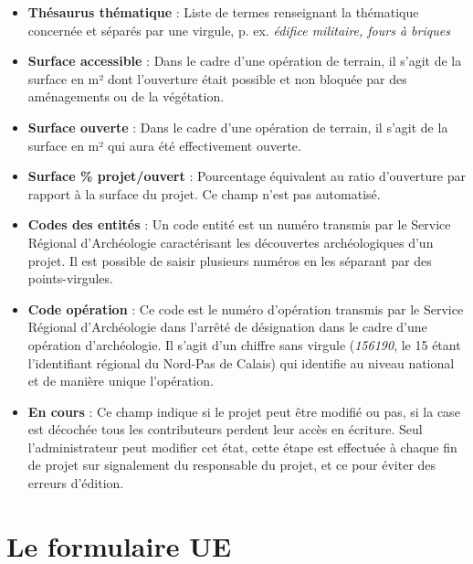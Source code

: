 \documentclass[letterpaper,10pt,french]{sphinxmanual}
\begin{document}
\begin{itemize}
\item {} 
\textbf{Thésaurus thématique} : Liste de termes renseignant la thématique concernée et séparés par une virgule, p. ex. \emph{édifice militaire, fours à briques}

\item {} 
\textbf{Surface accessible} : Dans le cadre d'une opération de terrain, il s'agit de la surface en m² dont l'ouverture était possible et non bloquée par des aménagements ou de la végétation.

\item {} 
\textbf{Surface ouverte} : Dans le cadre d'une opération de terrain, il s'agit de la surface en m² qui aura été effectivement ouverte.

\item {} 
\textbf{Surface \% projet/ouvert} : Pourcentage équivalent au ratio d'ouverture par rapport à la surface du projet.  Ce champ n'est pas automatisé.

\item {} 
\textbf{Codes des entités} : Un code entité est un numéro transmis par le Service Régional d'Archéologie caractérisant les découvertes archéologiques d'un projet. Il est possible de saisir plusieurs numéros en les séparant par des points-virgules.

\item {} 
\textbf{Code opération} : Ce code est le numéro d'opération transmis par le Service Régional d'Archéologie dans l'arrêté de désignation dans le cadre d'une opération d'archéologie. Il s'agit d'un chiffre sans virgule (\emph{156190}, le 15 étant l'identifiant régional du Nord-Pas de Calais) qui identifie au niveau national et de manière unique l'opération.

\item {} 
\textbf{En cours} : Ce champ indique si le projet peut être modifié ou pas, si la case est décochée tous les contributeurs perdent leur accès en écriture. Seul l'administrateur peut modifier cet état, cette étape est effectuée à chaque fin de projet sur signalement du responsable du projet, et ce pour éviter des erreurs d'édition.

\end{itemize}


\chapter{Le formulaire UE}
\label{manuel/formulaire_ue:le-formulaire-ue}\label{manuel/formulaire_ue::doc}
\end{document}
